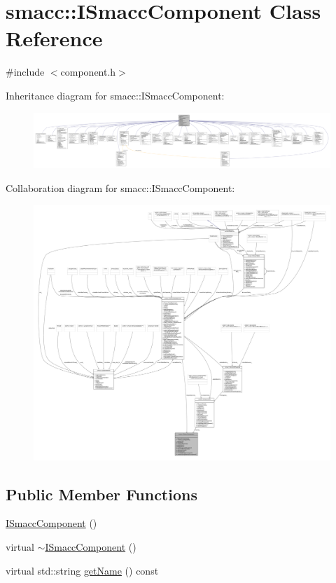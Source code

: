 \hypertarget{classsmacc_1_1ISmaccComponent}{}\section{smacc\+:\+:I\+Smacc\+Component Class Reference}
\label{classsmacc_1_1ISmaccComponent}


{\ttfamily \#include $<$component.\+h$>$}



Inheritance diagram for smacc\+:\+:I\+Smacc\+Component\+:
\nopagebreak
\begin{figure}[H]
\begin{center}
\leavevmode
\includegraphics[width=350pt]{classsmacc_1_1ISmaccComponent__inherit__graph}
\end{center}
\end{figure}


Collaboration diagram for smacc\+:\+:I\+Smacc\+Component\+:
\nopagebreak
\begin{figure}[H]
\begin{center}
\leavevmode
\includegraphics[width=350pt]{classsmacc_1_1ISmaccComponent__coll__graph}
\end{center}
\end{figure}
\subsection*{Public Member Functions}
\begin{DoxyCompactItemize}
\item 
\hyperlink{classsmacc_1_1ISmaccComponent_a43952d7269ddb81d017a80f018fe502e}{I\+Smacc\+Component} ()
\item 
virtual \hyperlink{classsmacc_1_1ISmaccComponent_a46f5cfc6a308de938b6ee3a5e80a8fe9}{$\sim$\+I\+Smacc\+Component} ()
\item 
virtual std\+::string \hyperlink{classsmacc_1_1ISmaccComponent_a8bfa94b1b1c616d55837ebba1b426c6e}{get\+Name} () const
\end{DoxyCompactItemize}

